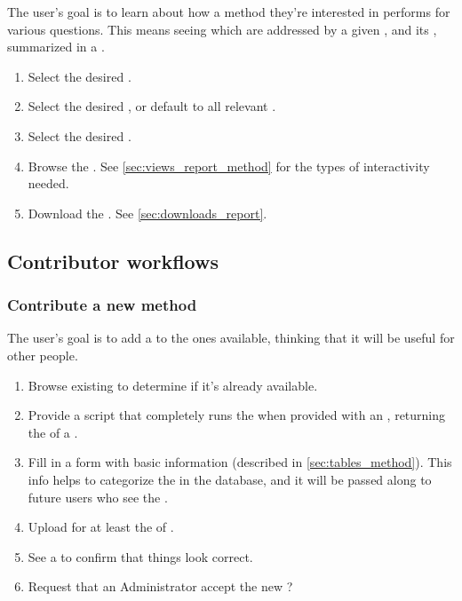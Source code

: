 The user's goal is to learn about how a method they're interested in performs for various questions.
This means seeing which \Tasks are addressed by a given \Method, and its \Performance, summarized in a \Report.

\begin{enumerate}
    \item Select the desired \Method.
    \item Select the desired \Task, or default to all relevant \Tasks.
    \item Select the desired \Elements.
    \item Browse the \Report.
          See \cref{sec:views_report_method} for the types of interactivity needed.
    \item Download the \Report.
          See \cref{sec:downloads_report}.
\end{enumerate}

\subsection{Contributor workflows}
\label{sec:workflows_contrib}

\subsubsection{Contribute a new method}

The user's goal is to add a \Method to the ones available, thinking that it will be useful for other people.

\begin{enumerate}
    \item Browse existing \Methods to determine if it's already available.
    \item Provide a script that completely runs the \Method when provided with an \Element, returning the \Result of a \Task.
    \item Fill in a form with basic information (described in \cref{sec:tables_method}).
          This info helps to categorize the \Method in the database, and it will be passed along to future users who see the \Method.
    \item Upload \Results for at least the \Benchmark of \Elements.
    \item See a \Report to confirm that things look correct.
    \item Request that an Administrator accept the new \Method?
\end{enumerate}

